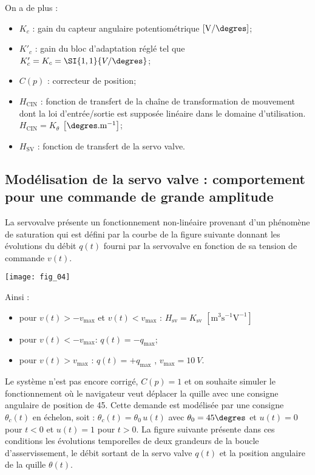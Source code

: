 \begin{multicols}{2}
On a de plus :
\begin{itemize}
\item $K_c$ : gain du capteur angulaire potentiométrique $\left[\text{V}/\degres\right]$;
\item $K'_c$ : gain du bloc d'adaptation réglé tel que $K'_c=K_c=\SI{1,1}{V/\degres}$;
\item $C(p)$ : correcteur de position;
\item $H_{\text{CIN}}$ : fonction de transfert de la chaîne de transformation de mouvement dont la loi
d’entrée/sortie est supposée linéaire dans le domaine d’utilisation. $H_{\text{CIN}}=K_{\theta}$ $\left[\degres.\text{m}^{-1}\right]$;
\item $H_{\text{SV}}$ : fonction de transfert de la servo valve.
\end{itemize}

\fi

\subsection*{Modélisation de la servo valve : comportement pour une commande de grande amplitude}

\ifprof
\else
La servovalve présente un fonctionnement non-linéaire provenant
d’un phénomène de saturation qui est défini par la courbe de la
figure suivante donnant les évolutions du débit $q(t)$ fourni par la
servovalve en fonction de sa tension de commande $v(t)$.
\begin{center}
\texttt{[image: fig\_04]}

\end{center}

Ainsi :
\begin{itemize}
\item pour $v(t) > -v_{\text{max}}$ et $v(t) < v_{\text{max}}$ : $H_{\text{sv}} = K_{\text{sv}}$ $\left[\text{m}^3 \text{s}^{-1}\text{V}^{-1}\right]$
\item pour $v(t) < -v_{\text{max}}$: $q(t) = -q_{\text{max}}$;
\item pour $v(t) > v_{\text{max}}$ : $q(t) = +q_{\text{max}}$ , $v_{\text{max}} = \SI{10}{V}$.
\end{itemize}
Le système n’est pas encore corrigé, $C(p) =1$ et on souhaite simuler
le fonctionnement où le navigateur veut déplacer la quille avec une
consigne angulaire de position de 45\degres. Cette demande est modélisée
par une consigne $\theta_c(t)$ en échelon, soit : $\theta_c(t)=\theta_0\,u(t)$ avec $\theta_0=45\degres$ et
$u(t) = 0$ pour $t < 0$ et $u(t) = 1$ pour $t > 0$. La figure suivante présente dans ces conditions les évolutions temporelles de deux grandeurs de la boucle d’asservissement, le débit sortant de la servo valve
$q(t)$ et la position angulaire de la quille $\theta(t)$.


\end{multicols}
